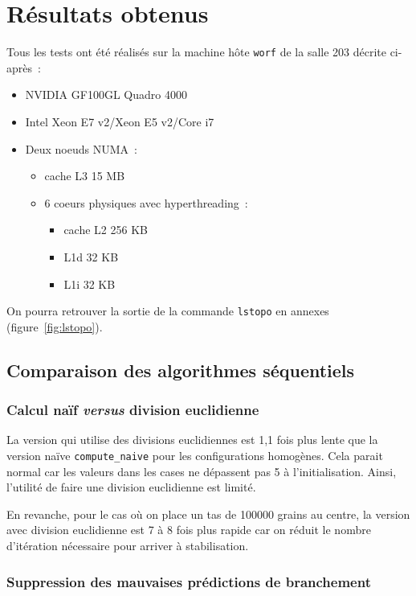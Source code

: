 \section {Résultats obtenus}

Tous les tests ont été réalisés sur la machine hôte \texttt{worf} de
la salle 203 décrite ci-après~:
\begin{itemize}
\item NVIDIA GF100GL Quadro 4000
\item Intel Xeon E7 v2/Xeon E5 v2/Core i7
\item Deux noeuds NUMA~:
  \begin{itemize}
  \item cache L3 15 MB
  \item 6 coeurs physiques avec hyperthreading~:
    \begin{itemize}
    \item cache L2 256 KB
    \item L1d 32 KB
    \item L1i 32 KB
    \end{itemize}
  \end{itemize}
\end{itemize}
On pourra retrouver la sortie de la commande \texttt{lstopo} en
annexes (figure~\ref{fig:lstopo}).

\subsection{Comparaison des algorithmes séquentiels}

\subsubsection{Calcul naïf \textit{versus} division euclidienne}

La version qui utilise des divisions euclidiennes
 est 1,1 fois plus lente que la version naïve
\texttt{compute\_naive} pour les configurations homogènes. Cela parait
normal car les valeurs dans les cases ne dépassent pas 5 à
l'initialisation. Ainsi, l'utilité de faire une division euclidienne
est limité.

En revanche, pour le cas où on place un tas de 100000 grains au
centre, la version avec division euclidienne est 7 à 8 fois plus
rapide car on réduit le nombre d'itération nécessaire pour arriver à
stabilisation.

\subsubsection{Suppression des mauvaises prédictions de branchement}
\label{sec:predict}

